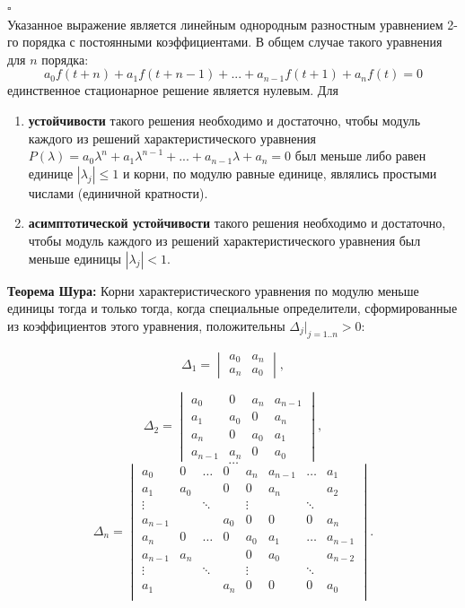 \documentclass[a4paper]{article}
\newcommand{\solutionstart}{{\noindent $\square$ \\}}
\begin{document}
\solutionstart
Указанное выражение является линейным однородным разностным уравнением 2-го порядка с постоянными коэффициентами. В общем случае такого уравнения для $n$ порядка:
\[
a_0 f (t + n) + a_1 f(t + n - 1) + ... + a_{n-1} f(t + 1) + a_n f(t) = 0
\]
единственное стационарное решение является нулевым. Для 
\begin{enumerate}
\item \textbf{устойчивости} такого решения необходимо и достаточно, чтобы модуль каждого из решений характеристического уравнения $P(\lambda) = a_{0} \lambda^{n} + a_{1} \lambda^{n - 1} + ... + a_{n - 1} \lambda + a_{n} = 0$ был меньше либо равен единице $|\lambda_j| \le 1$ и корни, по модулю равные единице, являлись простыми числами (единичной кратности).
\item \textbf{асимптотической устойчивости} такого решения необходимо и достаточно, чтобы модуль каждого из решений характеристического уравнения был меньше единицы $|\lambda_j| < 1$.
\end{enumerate}

\textbf{Теорема Шура:} Корни характеристического уравнения по модулю меньше единицы тогда и только тогда, когда специальные определители, сформированные из коэффициентов этого уравнения, положительны $\Delta_j|_{j=1..n} > 0$:

\[
\Delta_1 = 
\begin{vmatrix}
a_0 & a_n \\
a_n & a_0
\end{vmatrix},
\]

\[
\Delta_2 = 
\begin{vmatrix}
a_0 & 0 & a_n & a_{n - 1} \\
a_1 & a_0 & 0 &  a_n \\
a_n & 0 & a_0 & a_1 \\
a_{n-1} & a_n & 0 & a_0
\end{vmatrix},
\]
\[ \dots \]
\[
\Delta_n = 
\begin{vmatrix}
a_0 & 0 & \dots & 0 & a_n & a_{n-1} & \dots & a_1 \\
a_1 & a_0 &  & 0 & 0 & a_n &  & a_2 \\
\vdots &  & \ddots & & \vdots &  & \ddots & \\
a_{n-1} &  &  & a_0 & 0 & 0 & 0 & a_{n} \\
a_{n} & 0 & \dots & 0 & a_0 & a_1 & \dots & a_{n-1} \\
a_{n-1} & a_n & &  & 0 & a_0 &  & a_{n-2} \\
\vdots &  & \ddots &  & \vdots &  & \ddots &  \\
a_1 &  &  & a_n & 0 & 0 & 0 & a_0 \\
\end{vmatrix}.
\]
\end{document}
